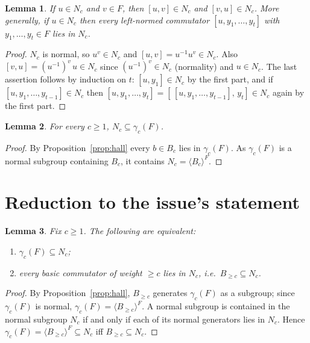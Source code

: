 \documentclass{amsart}
\newtheorem{lemma}{Lemma}
\theoremstyle{definition}
\theoremstyle{remark}
\begin{document}
\begin{lemma}\label{lem:caseA}
If $u\in N_c$ and $v\in F$, then $[u,v]\in N_c$ and $[v,u]\in N_c$. More generally,
if $u\in N_c$ then every left-normed commutator $[u,y_1,\dots,y_t]$ with
$y_1,\dots,y_t\in F$ lies in $N_c$.
\end{lemma}

\begin{proof}
$N_c$ is normal, so $u^{v}\in N_c$ and $[u,v]=u^{-1}u^{v}\in N_c$. Also
$[v,u]=(u^{-1})^{v}\,u\in N_c$ since $(u^{-1})^{v}\in N_c$ (normality) and
$u\in N_c$. The last assertion follows by induction on $t$: $[u,y_1]\in N_c$ by
the first part, and if $[u,y_1,\dots,y_{t-1}]\in N_c$ then
$[u,y_1,\dots,y_t]=[\,[u,y_1,\dots,y_{t-1}],\,y_t]\in N_c$ again by the first part.
\end{proof}

\begin{lemma}\label{lem:easy}
For every $c\ge1$, $N_c\subseteq\gamma_c(F)$.
\end{lemma}

\begin{proof}
By Proposition~\ref{prop:hall} every $b\in B_c$ lies in $\gamma_c(F)$. As
$\gamma_c(F)$ is a normal subgroup containing $B_c$, it contains
$N_c=\langle B_c\rangle^{F}$.
\end{proof}

\section{Reduction to the issue's statement}\label{sec:reduce0}

\begin{lemma}\label{lem:reduce-to-Bw}
Fix $c\ge1$. The following are equivalent:
\begin{enumerate}
\item[(i)] $\gamma_c(F)\subseteq N_c$;
\item[(ii)] every basic commutator of weight $\ge c$ lies in $N_c$, i.e.\
$B_{\ge c}\subseteq N_c$.
\end{enumerate}
\end{lemma}

\begin{proof}
By Proposition~\ref{prop:hall}, $B_{\ge c}$ generates $\gamma_c(F)$ as a subgroup;
since $\gamma_c(F)$ is normal, $\gamma_c(F)=\langle B_{\ge c}\rangle^{F}$. A normal
subgroup is contained in the normal subgroup $N_c$ if and only if each of its
normal generators lies in $N_c$. Hence
$\gamma_c(F)=\langle B_{\ge c}\rangle^{F}\subseteq N_c$ iff $B_{\ge c}\subseteq
N_c$.
\end{proof}
\end{document}

